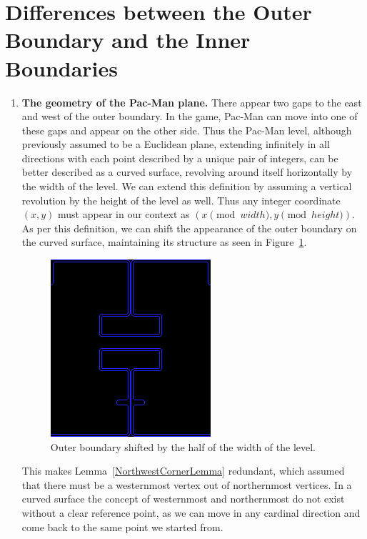 \section{Differences between the Outer Boundary and the Inner Boundaries}
\begin{enumerate}
\item { \bf The geometry of the Pac-Man plane.} There appear two gaps to the east and west of the outer boundary. In the game, Pac-Man can move into one of these gaps and appear on the other side. Thus the Pac-Man level, although previously assumed to be a Euclidean plane, extending infinitely in all directions with each point described by a unique pair of integers, can be better described as a curved surface, revolving around itself horizontally by the width of the level. We can extend this definition by assuming a vertical revolution by the height of the level as well. Thus any integer coordinate $(x,y)$ must appear in our context as $(x \pmod{width}, y\pmod{height})$. As per this definition, we can shift the appearance of the outer boundary on the curved surface, maintaining its structure as seen in Figure~\ref{ShiftedOuterBoundary}.
\begin{figure}[H]
\centering
\includegraphics[width=0.6\linewidth]{Image-12.png}
\caption {Outer boundary shifted by the half of the width of the level.\autocite{pittman_pac-man_2009}}\label{ShiftedOuterBoundary}
\end{figure}
This makes Lemma~\ref{NorthwestCornerLemma} redundant, which assumed that there must be a westernmost vertex out of northernmost vertices. In a curved surface the concept of westernmost and northernmost do not exist without a clear reference point, as we can move in any cardinal direction and come back to the same point we started from. 

\end{enumerate}
